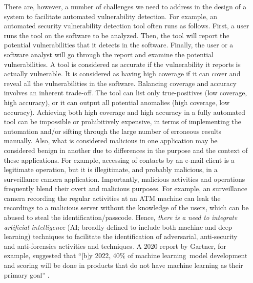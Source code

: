 
There are, however, a number of challenges we need to address in the
design of a system to facilitate automated vulnerability detection.
For example, an automated security vulnerability detection tool often
runs as follows. First, a user runs the tool on the software to be
analyzed. Then, the tool will report the potential vulnerabilities
that it detects in the software. Finally, the user or a software
analyst will go through the report and examine the potential
vulnerabilities. A tool is considered as accurate if the vulnerability
it reports is actually vulnerable. It is considered as having high
coverage if it can cover and reveal all the vulnerabilities in the
software. Balancing coverage and accuracy involves an
inherent trade-off. The tool can list only true-positives (low
coverage, high accuracy), or it can output all potential anomalies
(high coverage, low accuracy). Achieving both high coverage and high
accuracy in a fully automated tool can be impossible or prohibitively
expensive, in terms of implementing the automation and/or sifting
through the large number of erroneous results manually.
Also, what is considered malicious in one application may be
considered benign in another due to differences in the purpose and the
context of these applications. For example, accessing of contacts by
an e-mail client is a legitimate operation, but it is illegitimate,
and probably malicious, in a surveillance camera
application. Importantly, malicious activities and operations
frequently blend their overt and malicious purposes. For example, an
surveillance camera recording the regular activities at an ATM machine
can leak the recordings to a malicious server without the knowledge of
the users, which can be abused to steal the
identification/passcode. Hence, {\em there is a need to integrate
artificial intelligence} (AI; broadly defined to include both machine
and deep learning) techniques to facilitate the identification of
adversarial, anti-security and anti-forensics activities and
techniques. A 2020 report by Gartner, for example, suggested that
``[b]y 2022, 40\% of machine learning~model development and scoring
will be done in products that do not have machine learning as their
primary goal'' \cite{RichardsonGartner2020}.

